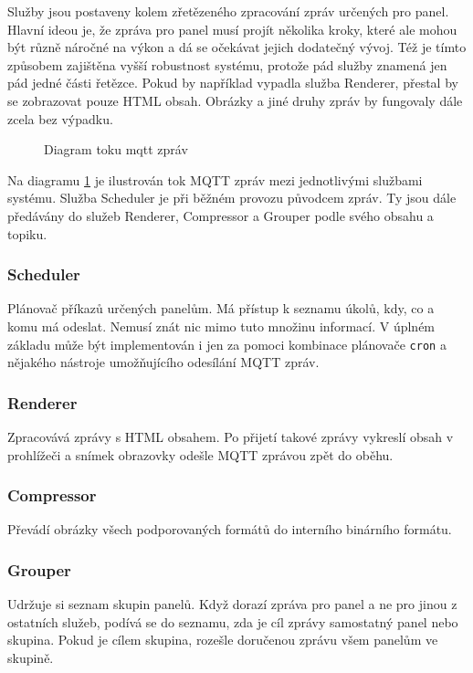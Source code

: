 Služby jsou postaveny kolem zřetězeného zpracování zpráv určených pro panel. Hlavní ideou je, že zpráva pro panel musí projít několika kroky, které ale mohou být různě náročné na výkon a dá se očekávat jejich dodatečný vývoj. Též je tímto způsobem zajištěna vyšší robustnost systému, protože pád služby znamená jen pád jedné části řetězce. Pokud by například vypadla služba Renderer, přestal by se zobrazovat pouze HTML obsah. Obrázky a jiné druhy zpráv by fungovaly dále zcela bez výpadku. 

\begin{figure}[h]
    \centering
    
    \caption{Diagram toku mqtt zpráv}
    \label{fig:final-system-microservices}
\end{figure}

Na diagramu \ref{fig:final-system-microservices} je ilustrován tok MQTT zpráv mezi jednotlivými službami systému. Služba Scheduler je při běžném provozu původcem zpráv. Ty jsou dále předávány do služeb Renderer, Compressor a Grouper podle svého obsahu a topiku.

\subsubsection*{Scheduler}
Plánovač příkazů určených panelům. Má přístup k seznamu úkolů, kdy, co a komu má odeslat. Nemusí znát nic mimo tuto množinu informací. V úplném základu může být implementován i jen za pomoci kombinace plánovače \lstinline|cron| a nějakého nástroje umožňujícího odesílání MQTT zpráv.

\subsubsection*{Renderer}
Zpracovává zprávy s HTML obsahem. Po přijetí takové zprávy vykreslí obsah v prohlížeči a snímek obrazovky odešle MQTT zprávou zpět do oběhu.

\subsubsection*{Compressor}
Převádí obrázky všech podporovaných formátů do interního binárního formátu.

\subsubsection*{Grouper}
Udržuje si seznam skupin panelů. Když dorazí zpráva pro panel a ne pro jinou z ostatních služeb, podívá se do seznamu, zda je cíl zprávy samostatný panel nebo skupina. Pokud je cílem skupina, rozešle doručenou zprávu všem panelům ve skupině.


